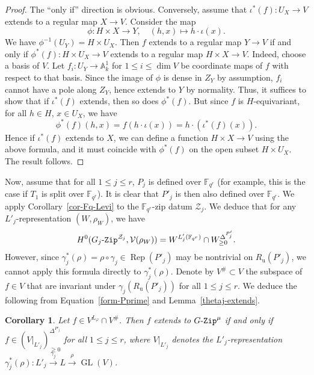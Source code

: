 \documentclass[11pt]{amsart}
\numberwithin{equation}{section}
\newtheorem{corollary}[theorem]{Corollary}
\theoremstyle{definition}
\theoremstyle{remark}
\newcommand{\GZip}{\mathop{\text{$G$-{\tt Zip}}}\nolimits}
\newcommand{\GjZip}{\mathop{\text{$G_j$-{\tt Zip}}}\nolimits}
\newcommand{\Vcal}{{\mathcal V}}
\newcommand{\Zcal}{{\mathcal Z}}
\newcommand{\FF}{\mathbb{F}}
\DeclareMathOperator{\Rep}{Rep}
\DeclareMathOperator{\GL}{GL}
\newcommand{\lra}{\longrightarrow}
\begin{document}
\begin{proof}
The ``only if'' direction is obvious. Conversely, assume that $\iota^*(f)\colon U_X\to V$ extends to a regular map $X\to V$. Consider the map
\begin{equation*}
    \phi \colon H\times X\lra Y, \quad (h,x)\longmapsto h\cdot \iota(x).
\end{equation*}
We have $\phi^{-1}(U_Y)=H\times U_X$. Then $f$ extends to a regular map $Y\to V$ if and only if $\phi^*(f)\colon H\times U_X\to V$ extends to  a regular map $H\times X\to V$. Indeed, choose a basis of $V$. Let $f_i \colon U_Y \to \mathbb{A}_k^1$ for $1 \leq i \leq \dim V$ be coordinate maps of $f$ with respect to that basis. Since the image of $\phi$ is dense in $Z_Y$ by assumption, $f_i$ cannot have a pole along $Z_Y$, hence extends to $Y$ by normality. Thus, it suffices to show that if $\iota^*(f)$ extends, then so does $\phi^*(f)$. But since $f$ is $H$-equivariant,  for all $h\in H$, $x\in U_X$, we have 
\begin{equation*}
    \phi^*(f)(h,x)=f(h\cdot \iota(x))=h\cdot \left( \iota^*(f)(x)\right).
\end{equation*}
Hence if $\iota^*(f)$ extends to $X$, we can define a function $H\times X\to V$ using the above formula, and it must coincide with $\phi^*(f)$ on the open subset $H\times U_X$. The result follows.
\end{proof}

Now, assume that for all $1\leq j \leq r$, $P_j$ is defined over $\FF_{q^r}$ (for example, this is the case if $T_1$ is split over $\FF_{q^r}$). It is clear that $P'_j$ is then also defined over $\FF_{q^r}$. We apply Corollary~\ref{cor-Fq-Levi} to the $\FF_{q^r}$-zip datum $\Zcal_j$. We deduce that for any $L'_j$-representation $(W,\rho_W)$, we have
\begin{equation}\label{form-Pprime}
    H^0(\GjZip^{\Zcal_j}, \Vcal(\rho_W)) = W^{L'_j(\FF_{q^r})}\cap W^{\Delta^{P'_j}}_{\geq 0}.
\end{equation}
However, since $\gamma_j^*(\rho)=\rho \circ \gamma_j \in \Rep(P'_j)$ may be nontrivial on $R_{\textrm{u}}(P'_j)$, we cannot apply this formula directly to $\gamma_j^*(\rho)$. Denote by $V^{\#}\subset V$ the subspace of $f\in V$ that are invariant under $\gamma_j(R_{\textrm{u}}(P'_j))$ for all $1\leq j \leq r$. We deduce the following from Equation~\eqref{form-Pprime} and Lemma~\ref{thetaj-extends}. 

\begin{corollary}
Let $f\in V^{L_\varphi}\cap V^{\#}$. Then $f$ extends to $\GZip^\mu$ if and only if $f\in \left( V|_{L'_j} \right)^{\Delta^{P'_j}}_{\geq 0}$ for all $1\leq j \leq r$, where $V|_{L'_j}$ denotes the $L'_j$-representation $\gamma_j^*(\rho) \colon L'_j \xrightarrow{\gamma_j} L \xrightarrow{\rho} \GL(V)$.
\end{corollary}
\end{document}
